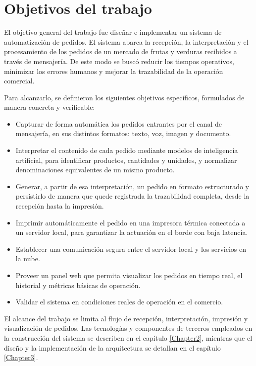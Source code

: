 \section{Objetivos del trabajo}
\label{sec:objetivos}

El objetivo general del trabajo fue diseñar e implementar un sistema de automatización de pedidos. El sistema abarca la recepción, la interpretación y el procesamiento de los pedidos de un mercado de frutas y verduras recibidos a través de mensajería. De este modo se buscó reducir los tiempos operativos, minimizar los errores humanos y mejorar la trazabilidad de la operación comercial.

Para alcanzarlo, se definieron los siguientes objetivos específicos, formulados de manera concreta y verificable:

\begin{itemize}
	\item Capturar de forma automática los pedidos entrantes por el canal de mensajería, en sus distintos formatos: texto, voz, imagen y documento.
	\item Interpretar el contenido de cada pedido mediante modelos de inteligencia artificial, para identificar productos, cantidades y unidades, y normalizar denominaciones equivalentes de un mismo producto.
	\item Generar, a partir de esa interpretación, un pedido en formato estructurado y persistirlo de manera que quede registrada la trazabilidad completa, desde la recepción hasta la impresión.
	\item Imprimir automáticamente el pedido en una impresora térmica conectada a un servidor local, para garantizar la actuación en el borde con baja latencia.
	\item Establecer una comunicación segura entre el servidor local y los servicios en la nube.
	\item Proveer un panel web que permita visualizar los pedidos en tiempo real, el historial y métricas básicas de operación.
	\item Validar el sistema en condiciones reales de operación en el comercio.
\end{itemize}

El alcance del trabajo se limita al flujo de recepción, interpretación, impresión y visualización de pedidos. Las tecnologías y componentes de terceros empleados en la construcción del sistema se describen en el capítulo \ref{Chapter2}, mientras que el diseño y la implementación de la arquitectura se detallan en el capítulo \ref{Chapter3}.
